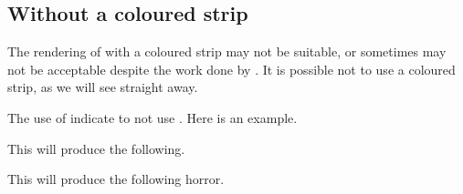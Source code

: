 \documentclass[10pt, a4paper]{tutodoc}
\begin{document}
\subsection{Without a coloured strip}

The rendering of  with a coloured strip may not be suitable, or sometimes may not be acceptable despite the work done by .
It is possible not to use a coloured strip, as we will see straight away.


\begin{tdocexa}
    The use of  indicate to not use .
    Here is an example.


    This will produce the following.

    \medskip

    
\end{tdocexa}




\begin{tdocexa}
    \leavevmode


    This will produce the following horror.

    \medskip

    
\end{tdocexa}
\end{document}
